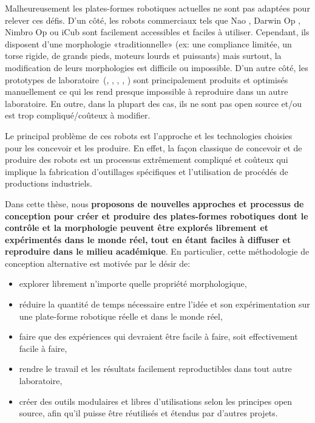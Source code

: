 Malheureusement les plates-formes robotiques actuelles ne sont pas adaptées pour relever ces défis. D'un côté, les robots commerciaux tels que Nao \parencite{gouaillier2008nao}, Darwin Op \parencite{ha2011development}, Nimbro Op \parencite{schwarznimbro} ou iCub \parencite{metta2008icub} sont facilement accessibles et faciles à utiliser. Cependant, ils disposent d’une morphologie «traditionnelle» (ex: une compliance limitée, un torse rigide, de grands pieds, moteurs lourds et puissants) mais surtout, la modification de leurs morphologies est difficile ou impossible.
D’un autre côté, les prototypes de laboratoire~(\cite{wisse2007passive}, \cite{nakanishi2013design}, \cite{ly2011bio}, \cite{niiyama2010athlete}, \cite{radkhah2011concept}) sont principalement produits et optimisés manuellement ce qui les rend presque impossible à reproduire dans un autre laboratoire. En outre, dans la plupart des cas, ils ne sont pas open source et/ou est trop compliqué/coûteux à modifier.

Le principal problème de ces robots est l’approche et les technologies choisies pour les concevoir et les produire. En effet, la façon classique de concevoir et de produire des robots est un processus extrêmement compliqué et coûteux qui implique la fabrication d’outillages spécifiques et l'utilisation de procédés de productions industriels.

Dans cette thèse, nous \textbf {proposons de nouvelles approches et processus de conception pour créer et produire des plates-formes robotiques dont le contrôle et la morphologie peuvent être explorés librement et expérimentés dans le monde réel, tout en étant faciles à diffuser et reproduire dans le milieu académique}. En particulier, cette méthodologie de conception alternative est motivée par le désir de:
\begin{itemize}
    \item explorer librement n'importe quelle propriété morphologique,
    \item réduire la quantité de temps nécessaire entre l'idée et son expérimentation sur une plate-forme robotique réelle et dans le monde réel,
    \item faire que des expériences qui devraient être facile à faire, soit effectivement facile à faire,
    \item rendre le travail et les résultats facilement reproductibles dans tout autre laboratoire,
    \item créer des outils modulaires et libres d'utilisations selon les principes open source, afin qu’il puisse être réutilisés et étendus par d'autres projets.
\end{itemize}


